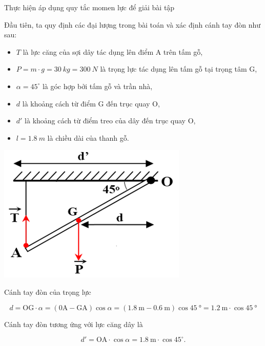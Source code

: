 \begin{dang}{Thực hiện áp dụng quy tắc momen lực để giải bài tập}
{		Đầu tiên, ta quy định các đại lượng trong bài toán và xác định cánh tay đòn như sau: 
		\begin{itemize}
			\item $T$ là lực căng của sợi dây tác dụng lên điểm A trên tấm gỗ, 
			\item $P=m\cdot g= \SI{30}{kg} = \SI{300}{N}$ là trọng lực tác dụng lên tấm gỗ tại trọng tâm G, 
			\item $\alpha = 45^{\circ}$ là góc hợp bởi tấm gỗ và trần nhà, 
			\item $d$ là khoảng cách từ điểm G đến trục quay O,
			\item $d'$ là khoảng cách từ điểm treo của dây đến trục quay O,
			\item $l=\SI{1,8}{m}$ là chiều dài của thanh gỗ. 
		\end{itemize}
		\begin{center}
			\includegraphics[scale=0.7]{../figs/VN10-PH-21-L-016-2-V2-03.png}
		\end{center}
		Cánh tay đòn của trọng lực
		
		$$d=\text{OG}\cdot\alpha=(\text{0A}-\text{GA})\cos\alpha=(\SI{1.8}{\meter}-\SI{0.6}{\meter})\cos\SI{45}{\degree}=\SI{1.2}{\meter}\cdot\cos\SI{45}{\degree}$$
		
		Cánh tay đòn tương ứng với lực căng dây là
		
		$$d' = \textrm{OA}\cdot\cos\alpha=\SI{1.8}{\meter}\cdot \cos 45^{\circ} .$$
		
}
\end{dang}
